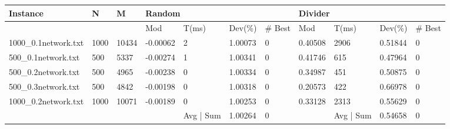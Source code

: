 \begin{sidewaystable} %
	\label{table:results1}
	\begin{tabular}{lllllllllll}
		\hline
		\multicolumn{1}{|l|}{Instance}             & \multicolumn{1}{l|}{N}    & \multicolumn{1}{l|}{M}     & \multicolumn{4}{l|}{Random}                                                               & \multicolumn{4}{l|}{Divider}                                                                                            \\ \hline
		\multicolumn{1}{|l|}{}                     & \multicolumn{1}{l|}{}     & \multicolumn{1}{l|}{}      & \multicolumn{1}{l|}{Mod}      & \multicolumn{1}{l|}{T(ms)} & \multicolumn{1}{l|}{Dev(\%)} & \multicolumn{1}{l|}{\# Best} & \multicolumn{1}{l|}{Mod}     & \multicolumn{1}{l|}{T(ms)} & \multicolumn{1}{l|}{Dev(\%)} & \multicolumn{1}{l|}{\# Best} \\ \hline
		\multicolumn{1}{|l|}{1000\_0.1network.txt} & \multicolumn{1}{l|}{1000} & \multicolumn{1}{l|}{10434} & \multicolumn{1}{l|}{-0.00062} & \multicolumn{1}{l|}{2}     & \multicolumn{1}{l|}{1.00073} & \multicolumn{1}{l|}{0}       & \multicolumn{1}{l|}{0.40508} & \multicolumn{1}{l|}{2906}  & \multicolumn{1}{l|}{0.51844} & \multicolumn{1}{l|}{0}       \\ \hline
		\multicolumn{1}{|l|}{500\_0.1network.txt}  & \multicolumn{1}{l|}{500}  & \multicolumn{1}{l|}{5337}  & \multicolumn{1}{l|}{-0.00274} & \multicolumn{1}{l|}{1}     & \multicolumn{1}{l|}{1.00341} & \multicolumn{1}{l|}{0}       & \multicolumn{1}{l|}{0.41746} & \multicolumn{1}{l|}{615}   & \multicolumn{1}{l|}{0.47964} & \multicolumn{1}{l|}{0}       \\ \hline
		\multicolumn{1}{|l|}{500\_0.2network.txt}  & \multicolumn{1}{l|}{500}  & \multicolumn{1}{l|}{4965}  & \multicolumn{1}{l|}{-0.00238} & \multicolumn{1}{l|}{0}     & \multicolumn{1}{l|}{1.00334} & \multicolumn{1}{l|}{0}       & \multicolumn{1}{l|}{0.34987} & \multicolumn{1}{l|}{451}   & \multicolumn{1}{l|}{0.50875} & \multicolumn{1}{l|}{0}       \\ \hline
		\multicolumn{1}{|l|}{500\_0.3network.txt}  & \multicolumn{1}{l|}{500}  & \multicolumn{1}{l|}{4842}  & \multicolumn{1}{l|}{-0.00198} & \multicolumn{1}{l|}{0}     & \multicolumn{1}{l|}{1.00318} & \multicolumn{1}{l|}{0}       & \multicolumn{1}{l|}{0.20573} & \multicolumn{1}{l|}{422}   & \multicolumn{1}{l|}{0.66978} & \multicolumn{1}{l|}{0}       \\ \hline
		\multicolumn{1}{|l|}{1000\_0.2network.txt} & \multicolumn{1}{l|}{1000} & \multicolumn{1}{l|}{10071} & \multicolumn{1}{l|}{-0.00189} & \multicolumn{1}{l|}{0}     & \multicolumn{1}{l|}{1.00253} & \multicolumn{1}{l|}{0}       & \multicolumn{1}{l|}{0.33128} & \multicolumn{1}{l|}{2313}  & \multicolumn{1}{l|}{0.55629} & \multicolumn{1}{l|}{0}       \\ \hline
		&                           &                            &                               & Avg | Sum                          & 1.00264                      & 0                            &                              & Avg | Sum                           & 0.54658                      & 0                           
	\end{tabular}
	

\end{sidewaystable}
